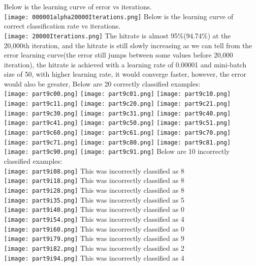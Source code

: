 \documentclass{article}
\begin{document}
\indent Below is the learning curve of error vs iterations.\\
\texttt{[image: 000001alpha20000Iterations.png]}
\indent Below is the learning curve of correct classification rate vs iterations.\\
\texttt{[image: 20000Iterations.png]}
\indent \indent \indent The hitrate is almost 95\%(94.74\%) at the 20,000th iteration, and the hitrate is still slowly increasing as we can tell from the error learning curve(the error still jumps between some values before 20,000 iteration), the hitrate is achieved with a learning rate of 0.00001 and mini-batch size of 50, with higher learning rate, it would converge faster, however, the error would also be greater, 
\indent Below are 20 correctly classified examples:\\
\texttt{[image: part9c00.png]}
\texttt{[image: part9c01.png]}
\texttt{[image: part9c10.png]}
\texttt{[image: part9c11.png]}
\texttt{[image: part9c20.png]}
\texttt{[image: part9c21.png]}
\texttt{[image: part9c30.png]}
\texttt{[image: part9c31.png]}
\texttt{[image: part9c40.png]}
\texttt{[image: part9c41.png]}
\texttt{[image: part9c50.png]}
\texttt{[image: part9c51.png]}
\texttt{[image: part9c60.png]}
\texttt{[image: part9c61.png]}
\texttt{[image: part9c70.png]}
\texttt{[image: part9c71.png]}
\texttt{[image: part9c80.png]}
\texttt{[image: part9c81.png]}
\texttt{[image: part9c90.png]}
\texttt{[image: part9c91.png]}
\clearpage
\indent Below are 10 incorrectly classified examples:\\
\texttt{[image: part9i08.png]}
\indent \indent \indent This was incorrectly classified as 8\\
\texttt{[image: part9i18.png]}
\indent \indent \indent This was incorrectly classified as 8\\
\texttt{[image: part9i28.png]}
\indent \indent \indent This was incorrectly classified as 8\\
\texttt{[image: part9i35.png]}
\indent \indent \indent This was incorrectly classified as 5\\
\texttt{[image: part9i40.png]}
\indent \indent \indent This was incorrectly classified as 0\\
\texttt{[image: part9i54.png]}
\indent \indent \indent This was incorrectly classified as 4\\
\texttt{[image: part9i60.png]}
\indent \indent \indent This was incorrectly classified as 0\\
\texttt{[image: part9i79.png]}
\indent \indent \indent This was incorrectly classified as 9\\
\texttt{[image: part9i82.png]}
\indent \indent \indent This was incorrectly classified as 2\\
\texttt{[image: part9i94.png]}
\indent \indent \indent This was incorrectly classified as 4\\
\clearpage
\end{document}
